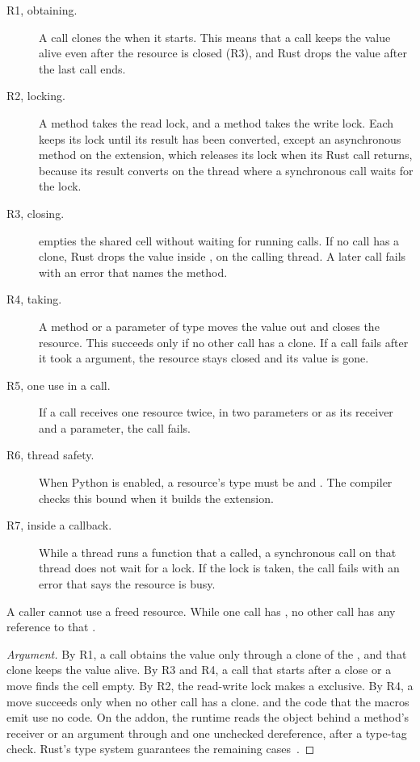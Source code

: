 \documentclass[sigconf,nonacm]{acmart}
\begin{document}
\begin{description}
\item[R1, obtaining.] A call clones the  when it starts. This means that a call keeps the value alive even after the resource is closed (R3), and Rust drops the value after the last call ends.
\item[R2, locking.] A  method takes the read lock, and a  method takes the write lock. Each keeps its lock until its result has been converted, except an asynchronous method on the extension, which releases its lock when its Rust call returns, because its result converts on the thread where a synchronous call waits for the lock.
\item[R3, closing.]  empties the shared cell without waiting for running calls. If no call has a clone, Rust drops the value inside , on the calling thread. A later call fails with an error that names the method.
\item[R4, taking.] A  method or a parameter of type  moves the value out and closes the resource. This succeeds only if no other call has a clone. If a call fails after it took a  argument, the resource stays closed and its value is gone.
\item[R5, one use in a call.] If a call receives one resource twice, in two parameters or as its receiver and a parameter, the call fails.
\item[R6, thread safety.] When Python is enabled, a resource's type must be  and . The compiler checks this bound when it builds the extension.
\item[R7, inside a callback.] While a thread runs a function that a  called, a synchronous call on that thread does not wait for a lock. If the lock is taken, the call fails with an error that says the resource is busy.
\end{description}

\begin{claim}[Aliasing]
\label{clm:aliasing}
A caller cannot use a freed resource. While one call has , no other call has any reference to that .
\end{claim}

\begin{proof}[Argument]
By R1, a call obtains the value only through a clone of the , and that clone keeps the value alive. By R3 and R4, a call that starts after a close or a move finds the cell empty. By R2, the read-write lock makes a  exclusive. By R4, a move succeeds only when no other call has a clone.  and the code that the macros emit use no  code. On the addon, the runtime reads the object behind a method's receiver or an argument through  and one unchecked dereference, after a type-tag check. Rust's type system guarantees the remaining cases~\cite{matsakis2014rust}.
\end{proof}
\end{document}
